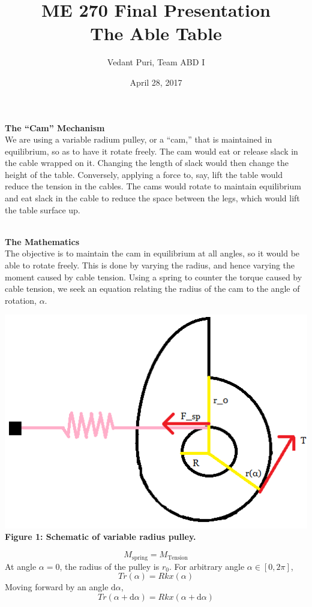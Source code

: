 \documentclass{article}
\title{ME 270 Final Presentation \\The Able Table}
\author{Vedant Puri, Team ABD I}
\date{April 28, 2017}
\begin{document}
\maketitle

\textbf{The ``Cam'' Mechanism}\\ We are using a variable radium pulley, or a ``cam,'' that is maintained in equilibrium, so as to have it rotate freely. The cam would eat or release slack in the cable wrapped on it. Changing the length of slack would then change the height of the table.
Conversely, applying a force to, say, lift the table would reduce the tension in the cables. The cams would rotate to maintain equilibrium and eat slack in the cable to reduce the space between the legs, which would lift the table surface up.

\bigskip

\\\textbf{The Mathematics} \\ The objective is to maintain the cam in equilibrium at all angles, so it would be able to rotate freely. This is done by varying the radius, and hence varying the moment caused by cable tension. Using a spring to counter the torque caused by cable tension, we seek an equation relating the radius of the cam to the angle of rotation, $\alpha$.

\begin{center}\bigskip\includegraphics[scale=0.5]{cam.png}\\\textbf{Figure 1: Schematic of variable radius pulley.} \end{center}

$$M_{\text{spring}}=M_{\text{Tension}}$$
At angle $\alpha=0$, the radius of the pulley is $r_0$. For arbitrary angle $\alpha\in[0,2\pi]$,
\begin{equation}
Tr(\alpha)=Rkx(\alpha)
\end{equation}
Moving forward by an angle $\text{d}\alpha$,
\begin{equation}
    Tr(\alpha+\text{d}\alpha)=Rkx(\alpha+\text{d}\alpha) 
\end{equation}
\end{document}

